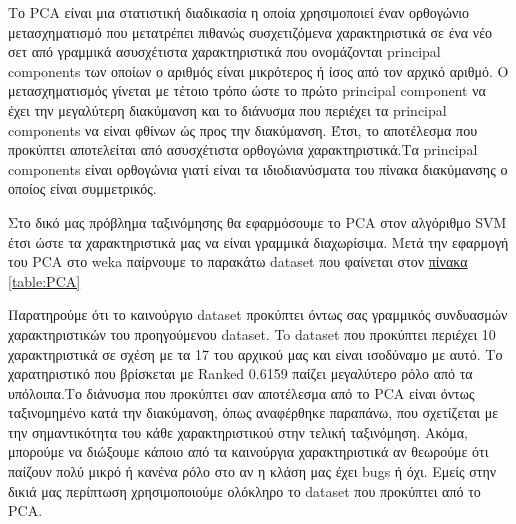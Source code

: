 Το PCA είναι μια στατιστική διαδικασία η οποία χρησιμοποιεί έναν ορθογώνιο μετασχηματισμό που μετατρέπει πιθανώς συσχετιζόμενα χαρακτηριστικά σε ένα νέο σετ από γραμμικά ασυσχέτιστα χαρακτηριστικά που ονομάζονται principal components των οποίων ο αριθμός είναι μικρότερος ή ίσος από τον αρχικό αριθμό.
Ο μετασχηματισμός γίνεται με τέτοιο τρόπο ώστε το πρώτο principal component να έχει την μεγαλύτερη διακύμανση και το διάνυσμα που περιέχει τα principal components να είναι φθίνων ώς προς την διακύμανση.
Έτσι, το αποτέλεσμα που προκύπτει αποτελείται από ασυσχέτιστα ορθογώνια χαρακτηριστικά.Τα principal components είναι ορθογώνια γιατί είναι τα ιδιοδιανύσματα του πίνακα διακύμανσης ο οποίος είναι συμμετρικός.

Στο δικό μας πρόβλημα ταξινόμησης θα εφαρμόσουμε το PCA στον αλγόριθμο SVM έτσι ώστε τα χαρακτηριστικά μας να είναι γραμμικά διαχωρίσιμα.
Μετά την εφαρμογή του PCA στο weka παίρνουμε το παρακάτω dataset που φαίνεται στον
\hyperref[table:PCA]{πίνακα \ref{table:PCA}}

Παρατηρούμε ότι το καινούργιο dataset προκύπτει όντως σας γραμμικός συνδυασμών χαρακτηριστικών του προηγούμενου dataset.
To dataset που προκύπτει περιέχει 10 χαρακτηριστικά σε σχέση με τα 17 του αρχικού μας και είναι ισοδύναμο με αυτό.
Το χαρατηριστικό που βρίσκεται με Ranked 0.6159 παίζει μεγαλύτερο ρόλο από τα υπόλοιπα.Το διάνυσμα που προκύπτει σαν αποτέλεσμα από το PCA είναι όντως ταξινομημένο κατά την διακύμανση,
όπως αναφέρθηκε παραπάνω,
που σχετίζεται με την σημαντικότητα του κάθε χαρακτηριστικού στην τελική ταξινόμηση.
Ακόμα, μπορούμε να διώξουμε κάποιο από τα καινούργια χαρακτηριστικά αν θεωρούμε ότι παίζουν πολύ μικρό ή κανένα ρόλο στο αν η κλάση μας έχει bugs ή όχι.
Εμείς στην δικιά μας περίπτωση χρησιμοποιούμε ολόκληρο το dataset που προκύπτει από το PCA.
 
\FloatBarrier